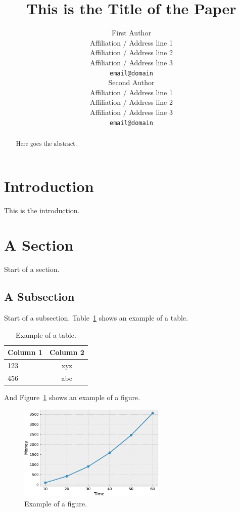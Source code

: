 \documentclass[11pt]{article}
\title{This is the Title of the Paper}
\author{First Author \\
  Affiliation / Address line 1 \\
  Affiliation / Address line 2 \\
  Affiliation / Address line 3 \\
  {\tt email@domain} \\\And
  Second Author \\
  Affiliation / Address line 1 \\
  Affiliation / Address line 2 \\
  Affiliation / Address line 3 \\
  {\tt email@domain} \\}
\date{}
\begin{document}
\maketitle
\begin{abstract}
Here goes the abstract.
\end{abstract}

\section{Introduction}
This is the introduction.

\section{A Section}

Start of a section.

\subsection{A Subsection}

Start of a subsection. Table~\ref{table:exampletable} shows an example of a table.

\begin{table}[htb]
\begin{center}
\begin{tabular}{l|c}
\hline \bf Column 1 & \bf Column 2\\ \hline
123 & xyz \\
456 & abc %
\end{tabular}
\end{center}
\caption{Example of a table.}
\label{table:exampletable}
\end{table}

And Figure~\ref{fig:examplefig} shows an example of a figure.

\begin{figure}[htb]
\begin{center}
\includegraphics[width=70mm]{example_figure}
\end{center}
\caption{Example of a figure.}
\label{fig:examplefig}
\end{figure}
\end{document}
